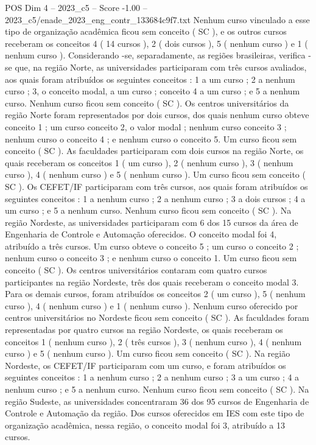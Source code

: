 \begin{textsample}{POS Dim 4 – 2023\_c5 – Score -1.00 – 2023\_c5/enade\_2023\_eng\_contr\_133684c9f7.txt}
Nenhum curso vinculado a esse tipo de organização acadêmica ficou sem conceito ( SC ), e os outros cursos receberam os conceitos 4 ( 14 cursos ), 2 ( dois cursos ), 5 ( nenhum curso ) e 1 ( nenhum curso ).
Considerando -se, separadamente, as regiões brasileiras, verifica -se que, na região Norte, as universidades participaram com três cursos avaliados, aos quais foram atribuídos os seguintes conceitos : 1 a um curso ; 2 a nenhum curso ; 3, o conceito modal, a um curso ; conceito 4 a um curso ; e 5 a nenhum curso.
Nenhum curso ficou sem conceito ( SC ).
Os centros universitários da região Norte foram representados por dois cursos, dos quais nenhum curso obteve conceito 1 ; um curso conceito 2, o valor modal ; nenhum curso conceito 3 ; nenhum curso o conceito 4 ; e nenhum curso o conceito 5.
Um curso ficou sem conceito ( SC ).
As faculdades participaram com dois cursos na região Norte, os quais receberam os conceitos 1 ( um curso ), 2 ( nenhum curso ), 3 ( nenhum curso ), 4 ( nenhum curso ) e 5 ( nenhum curso ).
Um curso ficou sem conceito ( SC ).
Os CEFET/IF participaram com três cursos, aos quais foram atribuídos os seguintes conceitos : 1 a nenhum curso ; 2 a nenhum curso ; 3 a dois cursos ; 4 a um curso ; e 5 a nenhum curso.
Nenhum curso ficou sem conceito ( SC ).
Na região Nordeste, as universidades participaram com 6 dos 15 cursos da área de Engenharia de Controle e Automação oferecidos.
O conceito modal foi 4, atribuído a três cursos.
Um curso obteve o conceito 5 ; um curso o conceito 2 ; nenhum curso o conceito 3 ; e nenhum curso o conceito 1.
Um curso ficou sem conceito ( SC ).
Os centros universitários contaram com quatro cursos participantes na região Nordeste, três dos quais receberam o conceito modal 3.
Para os demais cursos, foram atribuídos os conceitos 2 ( um curso ), 5 ( nenhum curso ), 4 ( nenhum curso ) e 1 ( nenhum curso ).
Nenhum curso oferecido por centros universitários no Nordeste ficou sem conceito ( SC ).
As faculdades foram representadas por quatro cursos na região Nordeste, os quais receberam os conceitos 1 ( nenhum curso ), 2 ( três cursos ), 3 ( nenhum curso ), 4 ( nenhum curso ) e 5 ( nenhum curso ).
Um curso ficou sem conceito ( SC ).
Na região Nordeste, os CEFET/IF participaram com um curso, e foram atribuídos os seguintes conceitos : 1 a nenhum curso ; 2 a nenhum curso ; 3 a um curso ; 4 a nenhum curso ; e 5 a nenhum curso.
Nenhum curso ficou sem conceito ( SC ).
Na região Sudeste, as universidades concentraram 36 dos 95 cursos de Engenharia de Controle e Automação da região.
Dos cursos oferecidos em IES com este tipo de organização acadêmica, nessa região, o conceito modal foi 3, atribuído a 13 cursos.

\end{textsample}
